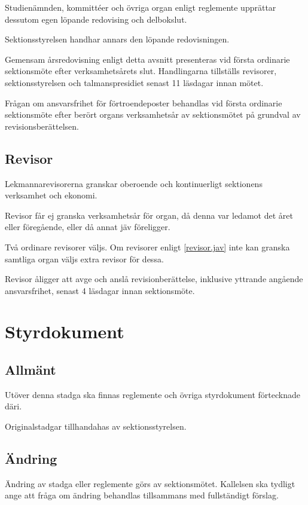 \documentclass{styrdokument}
\begin{document}
\? Studienämnden, kommittéer och övriga organ enligt reglemente upprättar dessutom egen löpande redovising och delbokslut.

\? Sektionsstyrelsen handhar annars den löpande redovisningen.

\? Gemensam årsredovisning enligt detta avsnitt presenteras vid första ordinarie sektionsmöte efter verksamhetsårets slut.
Handlingarna tillställs revisorer, sektionsstyrelsen och talmanspresidiet senast 11 läsdagar innan mötet.

\? Frågan om ansvarsfrihet för förtroendeposter behandlas vid första ordinarie sektionsmöte efter berört organs verksamhetsår av sektionsmötet på grundval av revisionsberättelsen.

\subsection{Revisor}

\? Lekmannarevisorerna granskar oberoende och kontinuerligt sektionens verksamhet och ekonomi.

\? Revisor får ej granska verksamhetsår för organ, då denna var ledamot det året eller föregående, eller då annat jäv föreligger.
\label{revisor.jav}

\? Två ordinare revisorer väljs.
Om revisorer enligt \cref{revisor.jav} inte kan granska samtliga organ väljs extra revisor för dessa.

\? Revisor åligger att avge och anslå revisionberättelse, inklusive yttrande angående ansvarsfrihet, senast 4 läsdagar innan sektionsmöte.

\section{Styrdokument}
\subsection{Allmänt}

\? Utöver denna stadga ska finnas reglemente och övriga styrdokument förtecknade däri.

\? Originalstadgar tillhandahas av sektionsstyrelsen.

\subsection{Ändring}

\? Ändring av stadga eller reglemente görs av sektionsmötet.
Kallelsen ska tydligt ange att fråga om ändring behandlas tillsammans med fullständigt förslag.
\label{beslut.andring.kallelse}
\end{document}
